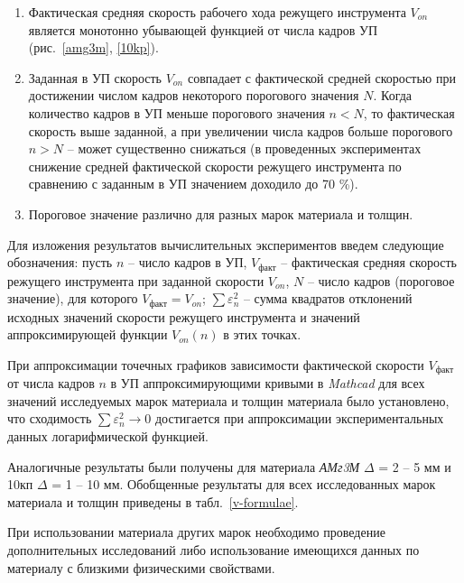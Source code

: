 \documentclass[11pt,twoside,openany]{report}
\begin{document}
\begin{enumerate}
\item
Фактическая средняя скорость рабочего хода режущего инструмента
$V_{on}$
является монотонно убывающей функцией от числа кадров УП
(рис.~\ref{amg3m}, \ref{10kp}).

\item
Заданная в УП скорость
$V_{on}$
совпадает с фактической средней скоростью
при достижении числом кадров некоторого порогового значения $N$.
Когда количество кадров в УП меньше порогового значения $n<N$,
то фактическая скорость выше заданной,
а при увеличении числа кадров больше порогового $n>N$
-- может существенно снижаться
(в проведенных экспериментах снижение средней
фактической скорости режущего инструмента по сравнению
с заданным в УП значением доходило до 70 \%).

\item
Пороговое значение различно для разных марок материала и толщин.

\end{enumerate}

Для изложения результатов вычислительных экспериментов
введем следующие обозначения:
пусть
$n$ -- число кадров в УП,
$V_\text{факт}$ -- фактическая средняя скорость режущего инструмента при заданной скорости $V_{on}$,
$N$ -- число кадров (пороговое значение), для которого $V_\text{факт}=V_{on}$;
$\sum \varepsilon_n^2$ -- сумма квадратов отклонений исходных значений
скорости режущего инструмента и значений аппроксимирующей функции $V_{on}(n)$
в этих точках.

При аппроксимации точечных графиков
зависимости фактической скорости
$V_\text{факт}$
от числа кадров $n$
в УП аппроксимирующими кривыми в
{\it Mathcad}
для всех значений исследуемых марок материала и толщин материала было установлено,
что сходимость
$\sum \varepsilon_n^2 \to 0$
достигается при аппроксимации экспериментальных данных логарифмической функцией.

Аналогичные результаты были получены для материала
{\it АМг3М} $\Delta$ = 2 -- 5 мм
и 10кп $\Delta$ = 1 -- 10 мм.
Обобщенные результаты для всех исследованных марок материала и толщин
приведены в табл.~\ref{v-formulae}.

При использовании материала других марок
необходимо проведение дополнительных исследований
либо использование имеющихся данных по материалу
с близкими физическими свойствами.
\end{document}
